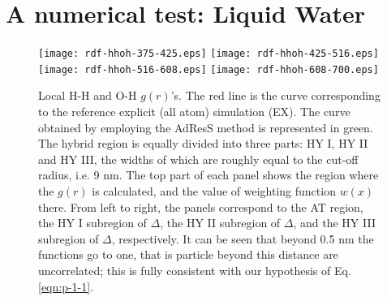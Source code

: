 \documentclass[aps,a4paper,reprint,onecolumn]{revtex4}
\begin{document}
\section{A numerical test: Liquid Water}
\begin{figure}
  \centering
  \texttt{[image: rdf-hhoh-375-425.eps]}
  \texttt{[image: rdf-hhoh-425-516.eps]}
  \texttt{[image: rdf-hhoh-516-608.eps]}
  \texttt{[image: rdf-hhoh-608-700.eps]}
  \caption{Local H-H and O-H $g(r)$'s.
    The red line is the curve corresponding to the reference explicit (all atom)
    simulation (EX).
    The curve obtained by employing the AdResS 
    method is represented in green.
    The hybrid region is equally
    divided into three parts: HY I, HY II and HY III, the widths of
    which are roughly equal to the cut-off radius, i.e. 9 \textsf{nm}.    
    The top part of each panel shows the region where the $g(r)$ is calculated,
    and the value of weighting function $w(x)$ there.
    From left to right, the panels correspond to the AT region, 
    the HY I subregion of $\Delta$,
    the HY II subregion of $\Delta$,
    and the HY III subregion of $\Delta$, respectively. It can be seen that beyond 0.5 \textsf{nm} the functions go to one, that is particle beyond this distance are uncorrelated; this is fully consistent with our hypothesis of Eq.\ref{eqn:p-1-1}.}
  \label{fig:tmp2a}
\end{figure}
\end{document}
